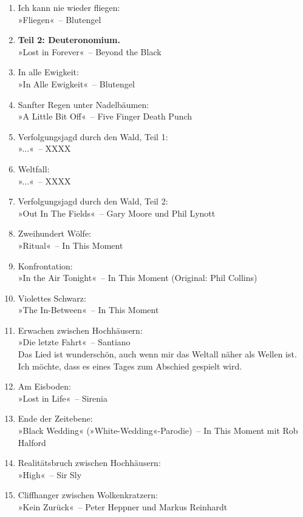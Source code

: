 \begin{enumerate}
    \item Ich kann nie wieder fliegen:\\ »Fliegen«~– Blutengel
    \item \textbf{Teil 2: Deuteronomium.}\\ »Lost in Forever«~– Beyond the Black
    \item In alle Ewigkeit:\\ »In Alle Ewigkeit«~– Blutengel
    \item Sanfter Regen unter Nadelbäumen:\\ »A Little Bit Off«~– Five Finger Death Punch
    \item Verfolgungsjagd durch den Wald, Teil 1:\\ »...«~– XXXX
    \item Weltfall:\\ »...«~– XXXX
    \item Verfolgungsjagd durch den Wald, Teil 2:\\ »Out In The Fields«~– Gary Moore und Phil Lynott
    \item Zweihundert Wölfe:\\ »Ritual«~– In This Moment
    \item Konfrontation:\\ »In the Air Tonight«~– In This Moment (Original: Phil Collins)
    \item Violettes Schwarz:\\ »The In-Between«~– In This Moment
    \item Erwachen zwischen Hochhäusern:\\ »Die letzte Fahrt«~– Santiano\\Das Lied ist wunderschön, auch wenn mir das Weltall näher als Wellen ist. Ich möchte, dass es eines Tages zum Abschied gespielt wird.

    \item Am Eisboden:\\ »Lost in Life«~– Sirenia

    \item Ende der Zeitebene:\\ »Black Wedding« (»White-Wedding«-Parodie)~– In This Moment mit Rob Halford
    \item Realitätsbruch zwischen Hochhäusern:\\ »High«~– Sir Sly
    \item Cliffhanger zwischen Wolkenkratzern:\\ »Kein Zurück«~– Peter Heppner und Markus Reinhardt



\end{enumerate}
